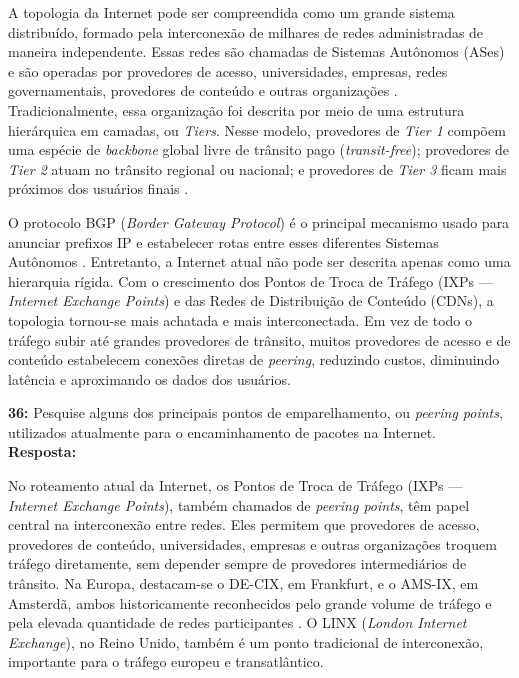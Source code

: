 \documentclass[12pt,a4paper]{report}
\begin{document}
A topologia da Internet pode ser compreendida como um grande sistema distribuído, formado pela interconexão de milhares de redes administradas de maneira independente. Essas redes são chamadas de Sistemas Autônomos (ASes) e são operadas por provedores de acesso, universidades, empresas, redes governamentais, provedores de conteúdo e outras organizações \cite{caida_itdk}. Tradicionalmente, essa organização foi descrita por meio de uma estrutura hierárquica em camadas, ou \textit{Tiers}. Nesse modelo, provedores de \textit{Tier 1} compõem uma espécie de \textit{backbone} global livre de trânsito pago (\textit{transit-free}); provedores de \textit{Tier 2} atuam no trânsito regional ou nacional; e provedores de \textit{Tier 3} ficam mais próximos dos usuários finais \cite{tanenbaum2011}.

O protocolo BGP (\textit{Border Gateway Protocol}) é o principal mecanismo usado para anunciar prefixos IP e estabelecer rotas entre esses diferentes Sistemas Autônomos \cite{rfc4271}. Entretanto, a Internet atual não pode ser descrita apenas como uma hierarquia rígida. Com o crescimento dos Pontos de Troca de Tráfego (IXPs --- \textit{Internet Exchange Points}) \cite{peeringdb} e das Redes de Distribuição de Conteúdo (CDNs), a topologia tornou-se mais achatada e mais interconectada. Em vez de todo o tráfego subir até grandes provedores de trânsito, muitos provedores de acesso e de conteúdo estabelecem conexões diretas de \textit{peering}, reduzindo custos, diminuindo latência e aproximando os dados dos usuários.

\vspace{0.6cm}

\noindent \textbf{36:} Pesquise alguns dos principais pontos de emparelhamento, ou \textit{peering points}, utilizados atualmente para o encaminhamento de pacotes na Internet. \\
\textbf{Resposta:}

No roteamento atual da Internet, os Pontos de Troca de Tráfego (IXPs --- \textit{Internet Exchange Points}), também chamados de \textit{peering points}, têm papel central na interconexão entre redes. Eles permitem que provedores de acesso, provedores de conteúdo, universidades, empresas e outras organizações troquem tráfego diretamente, sem depender sempre de provedores intermediários de trânsito. Na Europa, destacam-se o DE-CIX, em Frankfurt, e o AMS-IX, em Amsterdã, ambos historicamente reconhecidos pelo grande volume de tráfego e pela elevada quantidade de redes participantes \cite{ager2012anatomy}. O LINX (\textit{London Internet Exchange}), no Reino Unido, também é um ponto tradicional de interconexão, importante para o tráfego europeu e transatlântico.
\end{document}
